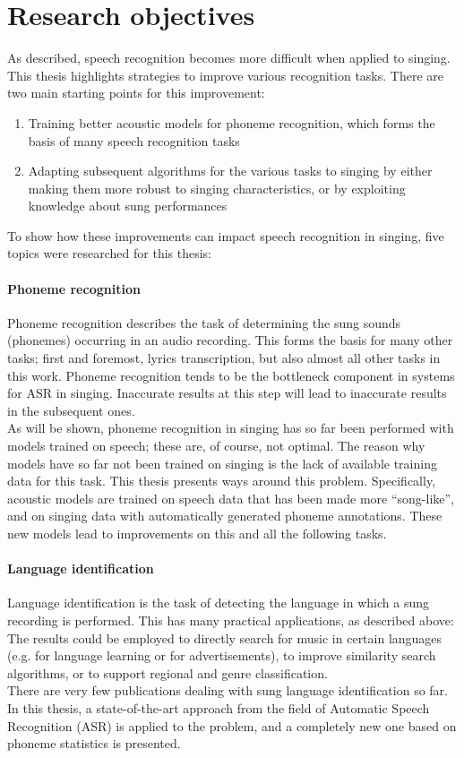 \section{Research objectives}
As described, speech recognition becomes more difficult when applied to singing. This thesis highlights strategies to improve various recognition tasks. There are two main starting points for this improvement:
\begin{enumerate}
\item Training better acoustic models for phoneme recognition, which forms the basis of many speech recognition tasks
\item Adapting subsequent algorithms for the various tasks to singing by either making them more robust to singing characteristics, or by exploiting knowledge about sung performances
\end{enumerate}

To show how these improvements can impact speech recognition in singing, five topics were researched for this thesis:

\paragraph{Phoneme recognition}
Phoneme recognition describes the task of determining the sung sounds (phonemes) occurring in an audio recording. This forms the basis for many other tasks; first and foremost, lyrics transcription, but also almost all other tasks in this work. Phoneme recognition tends to be the bottleneck component in systems for ASR in singing. Inaccurate results at this step will lead to inaccurate results in the subsequent ones.\\
As will be shown, phoneme recognition in singing has so far been performed with models trained on speech; these are, of course, not optimal. The reason why models have so far not been trained on singing is the lack of available training data for this task. This thesis presents ways around this problem. Specifically, acoustic models are trained on speech data that has been made more ``song-like'', and on singing data with automatically generated phoneme annotations. These new models lead to improvements on this and all the following tasks.

\paragraph{Language identification}
Language identification is the task of detecting the language in which a sung recording is performed. This has many practical applications, as described above: The results could be employed to directly search for music in certain languages (e.g. for language learning or for advertisements), to improve similarity search algorithms, or to support regional and genre classification.\\
There are very few publications dealing with sung language identification so far. In this thesis, a state-of-the-art approach from the field of Automatic Speech Recognition (ASR) is applied to the problem, and a completely new one based on phoneme statistics is presented.

